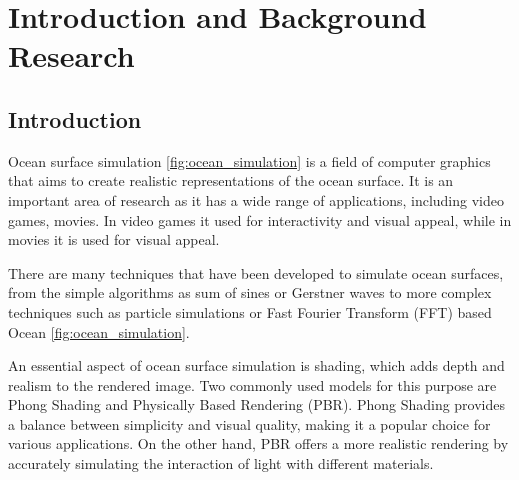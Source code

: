 \justifying
\chapter{Introduction and Background Research}



\label{chapter1}


\section{Introduction}
Ocean surface simulation \ref{fig:ocean_simulation} is a field of computer graphics that aims to create realistic representations of the ocean surface.
It is an important area of research as it has a wide range of applications, including video games, movies.
In video games it used for interactivity and visual appeal, while in movies it is used for visual appeal. 

There are many techniques that have been developed to simulate ocean surfaces, from the simple algorithms as 
sum of sines or Gerstner waves to more complex techniques such as particle simulations or Fast Fourier Transform (FFT) based Ocean \ref{fig:ocean_simulation}.

An essential aspect of ocean surface simulation is shading, which adds depth and realism to the rendered image. Two commonly used models for this purpose are Phong Shading and Physically Based Rendering (PBR). Phong Shading provides a balance between simplicity and visual quality, making it a popular choice for various applications. On the other hand, PBR offers a more realistic rendering by accurately simulating the interaction of light with different materials.

